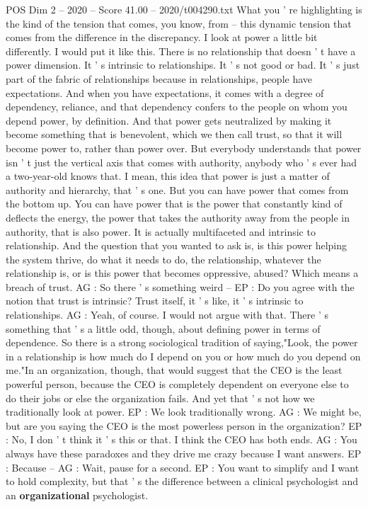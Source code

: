 \begin{textsample}{POS Dim 2 – 2020 – Score 41.00 – 2020/t004290.txt}
What you ' re highlighting is the kind of the tension that comes, you know, from -- this dynamic tension that comes from the difference in the discrepancy.
I look at power a little bit differently.
I would put it like this.
There is no relationship that doesn ' t have a power dimension.
It ' s intrinsic to relationships.
It ' s not good or bad.
It ' s just part of the fabric of relationships because in relationships, people have expectations.
And when you have expectations, it comes with a degree of dependency, reliance, and that dependency confers to the people on whom you depend power, by definition.
And that power gets neutralized by making it become something that is benevolent, which we then call trust, so that it will become power to, rather than power over.
But everybody understands that power isn ' t just the vertical axis that comes with authority, anybody who ' s ever had a two-year-old knows that.
I mean, this idea that power is just a matter of authority and hierarchy, that ' s one.
But you can have power that comes from the bottom up.
You can have power that is the power that constantly kind of deflects the energy, the power that takes the authority away from the people in authority, that is also power.
It is actually multifaceted and intrinsic to relationship.
And the question that you wanted to ask is, is this power helping the system thrive, do what it needs to do, the relationship, whatever the relationship is, or is this power that becomes oppressive, abused?
Which means a breach of trust.
AG : So there ' s something weird -- EP : Do you agree with the notion that trust is intrinsic?
Trust itself, it ' s like, it ' s intrinsic to relationships.
AG : Yeah, of course.
I would not argue with that.
There ' s something that ' s a little odd, though, about defining power in terms of dependence.
So there is a strong sociological tradition of saying,"Look, the power in a relationship is how much do I depend on you or how much do you depend on me."In an organization, though, that would suggest that the CEO is the least powerful person, because the CEO is completely dependent on everyone else to do their jobs or else the organization fails.
And yet that ' s not how we traditionally look at power.
EP : We look traditionally wrong.
AG : We might be, but are you saying the CEO is the most powerless person in the organization?
EP : No, I don ' t think it ' s this or that.
I think the CEO has both ends.
AG : You always have these paradoxes and they drive me crazy because I want answers.
EP : Because -- AG : Wait, pause for a second.
EP : You want to simplify and I want to hold complexity, but that ' s the difference between a clinical psychologist and an \textbf{organizational} psychologist.

\end{textsample}
